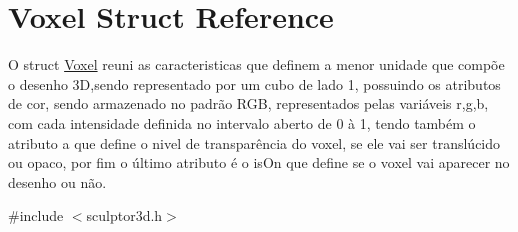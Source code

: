 \hypertarget{struct_voxel}{}\section{Voxel Struct Reference}
\label{struct_voxel}


O struct \mbox{\hyperlink{struct_voxel}{Voxel}} reuni as caracteristicas que definem a menor unidade que compõe o desenho 3D,sendo representado por um cubo de lado 1, possuindo os atributos de cor, sendo armazenado no padrão R\+GB, representados pelas variáveis \textquotesingle{}r\textquotesingle{},\textquotesingle{}g\textquotesingle{},\textquotesingle{}b\textquotesingle{}, com cada intensidade definida no intervalo aberto de 0 à 1, tendo também o atributo \textquotesingle{}a\textquotesingle{} que define o nivel de transparência do voxel, se ele vai ser translúcido ou opaco, por fim o último atributo é o \textquotesingle{}is\+On\textquotesingle{} que define se o voxel vai aparecer no desenho ou não.  




{\ttfamily \#include $<$sculptor3d.\+h$>$}

